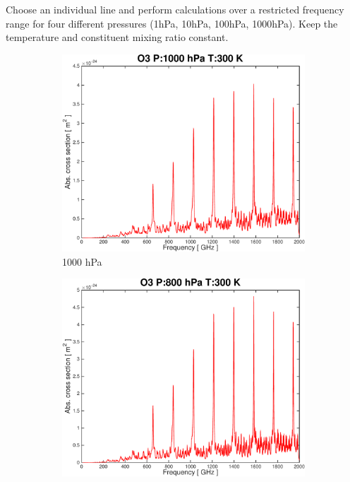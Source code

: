 \documentclass[paper=a4, fontsize=11pt]{scrartcl} %
\numberwithin{figure}{section}
\begin{document}
Choose an individual line and perform calculations over a restricted frequency range for four different pressures (1hPa, 10hPa, 100hPa, 1000hPa). Keep the temperature and constituent mixing ratio constant. 

\begin{figure}[t!]
 \centering
 \begin{subfigure}[t]{0.45\textwidth}
 \includegraphics[width=\textwidth]{plots/plot_xsec_O3_1000hPa_300K.pdf}
 \caption{1000 hPa}
 \end{subfigure}
 \begin{subfigure}[t]{0.45\textwidth}
 \includegraphics[width=\textwidth]{plots/plot_xsec_O3_800hPa_300K.pdf}

\end{subfigure}
\end{figure}
\end{document}
